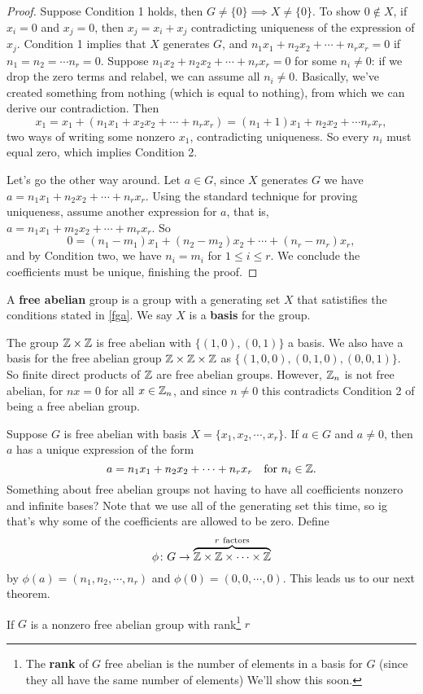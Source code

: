 \begin{proof}
    Suppose Condition 1 holds, then $G\neq \{0\} \implies X\neq \{0\}.$ To show $0\notin X$, if $x_i=0$ and $x_j=0$, then $x_j=x_i+x_j$ contradicting uniqueness of the expression of $x_j$. Condition 1 implies that $X$ generates $G$, and $n_1x_1+n_2x_2+\cdots+n_rx_r=0$ if $n_1=n_2=\cdots n_r=0$. Suppose $n_1x_2+n_2x_2+\cdots+n_rx_r=0$ for some $n_i\neq 0$: if we drop the zero terms and relabel, we can assume all $n_i\neq 0$. Basically, we've created something from nothing (which is equal to nothing), from which we can derive our contradiction. Then 
   \[
       x_1=x_1+(n_1x_1+x_2x_2+\cdots+n_rx_r)=(n_1+1)x_1+n_2x_2+\cdots n_rx_r,
   \] two ways of writing some nonzero $x_1$, contradicting uniqueness. So every $n_i$ must equal zero, which implies Condition 2.

   Let's go the other way around. Let $a\in G$, since $X$ generates $G$ we have $a=n_1x_1+n_2x_2+\cdots+n_rx_r$. Using the standard technique for proving uniqueness, assume another expression for $a $, that is, $a=n_1x_1+m_2x_2+\cdots+m_rx_r$. So \[
       0=(n_1-m_1)x_1+(n_2-m_2)x_2+\cdots+(n_r-m_r)x_r,
   \] and by Condition two, we have $n_i=m_i$ for $1\leq i \leq r$. We conclude the coefficients must be unique, finishing the proof.
\end{proof}
\begin{definition}
    A \textbf{free abelian} group is a group with a generating set $X$ that satistifies the conditions stated in \cref{fga}. We say $X$ is a \textbf{basis} for the group.
\end{definition}
\begin{example}
    The group $\mathbb{Z}\times \mathbb{Z}$ is free abelian with $\{(1,0),(0,1)\} $ a basis. We also have a basis for the free abelian group $\mathbb{Z}\times \mathbb{Z}\times \mathbb{Z}$ as $\{(1,0,0),(0,1,0),(0,0,1)\} $. So finite direct products of $\mathbb{Z}$ are free abelian groups. However, $\mathbb{Z}_n$ is not free abelian, for $nx=0$ for all $x\in \mathbb{Z}_n$, and since $n\neq 0$ this contradicts Condition 2 of being a free abelian group.
\end{example}
Suppose $G$ is free abelian with basis $X=\{x_1,x_2,\cdots,x_r\} $. If $a\in G$ and $a\neq 0$, then $a$ has a unique expression of the form \[
    a=n_1x_1+n_2x_2+\cdots+n_rx_r\quad \text{for} \ n_i\in \Z.
\] Something about free abelian groups not having to have all coefficients nonzero and infinite bases? Note that we use all of the generating set this time, so ig that's why some of the coefficients are allowed to be zero. Define \[
\phi \colon G \to \overset{r \ \text{factors}}{\overbrace{\Z\times \Z\times \cdots \times \Z}}
\] by $\phi(a)=(n_1,n_2,\cdots,n_r)$ and $\phi(0)=(0,0,\cdots,0)$. This leads us to our next theorem.
\begin{theorem}
    If $G$ is a nonzero free abelian group with rank\footnote{The \textbf{rank} of $G$ free abelian is the number of elements in a basis for $G$ (since they all have the same number of elements) We'll show this soon.} $r$
\end{theorem}






